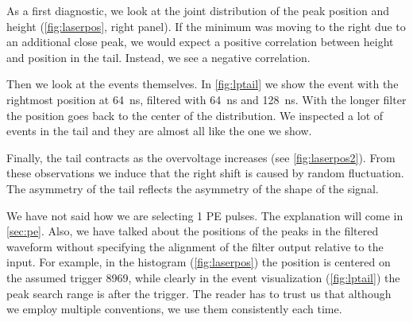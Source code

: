 \begin{figure}


    
\end{figure}

As a first diagnostic, we look at the joint distribution of the peak position
and height (\autoref{fig:laserpos}, right panel). If the minimum was moving to
the right due to an additional close peak, we would expect a positive
correlation between height and position in the tail. Instead, we see a negative
correlation.

Then we look at the events themselves. In \autoref{fig:lptail} we show the
event with the rightmost position at \SI{64}{ns}, filtered with \SI{64}{ns} and
\SI{128}{ns}. With the longer filter the position goes back to the center of
the distribution. We inspected a lot of events in the tail and they are almost
all like the one we show.

\begin{figure}



\end{figure}

Finally, the tail contracts as the overvoltage increases (see
\autoref{fig:laserpos2}). From these observations we induce that the right
shift is caused by random fluctuation. The asymmetry of the tail reflects the
asymmetry of the shape of the signal.

We have not said how we are selecting 1 PE pulses. The explanation will come in
\autoref{sec:pe}. Also, we have talked about the positions of the peaks in the
filtered waveform without specifying the alignment of the filter output
relative to the input. For example, in the histogram (\autoref{fig:laserpos})
the position is centered on the assumed trigger 8969, while clearly in the
event visualization (\autoref{fig:lptail}) the peak search range is after the
trigger. The reader has to trust us that although we employ multiple
conventions, we use them consistently each time.

